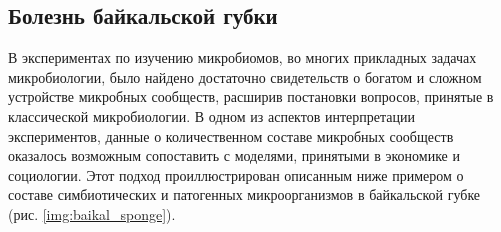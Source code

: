 



\subsection{Болезнь байкальской губки}

В экспериментах по изучению микробиомов, во многих прикладных задачах микробиологии, было найдено достаточно свидетельств о богатом и сложном устройстве микробных сообществ, расширив постановки вопросов, принятые в классической микробиологии. В одном из аспектов интерпретации экспериментов, данные о количественном составе микробных сообществ оказалось возможным сопоставить с моделями, принятыми в экономике и социологии. Этот подход проиллюстрирован описанным ниже примером о составе симбиотических и патогенных микроорганизмов в байкальской губке (рис. \ref{img:baikal_sponge}).

